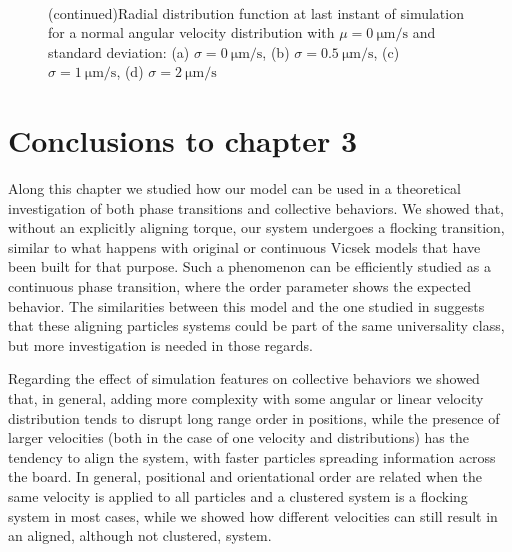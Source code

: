 \documentclass[../../master_thesis_np.tex]{subfiles}
\begin{document}
		\begin{figure}
		\centering
		\ContinuedFloat
			\\
			
			\caption{(continued)Radial distribution function at last instant of simulation for a normal angular velocity distribution with $\mu = \SI{0}{\um\per\second}$ and standard deviation: (a) $\sigma = \SI{0}{\um\per\second}$, (b) $\sigma = \SI{0.5}{\um\per\second}$, (c) $\sigma = \SI{1}{\um\per\second}$, (d) $\sigma = \SI{2}{\um\per\second}$}
			\label{fig:lj_av_rdf}
		\end{figure}
		
    \section{Conclusions to chapter 3}
    \label{3concl}
    Along this chapter we studied how our model can be used in a theoretical investigation of both phase transitions and collective behaviors.
    We showed that, without an explicitly aligning torque, our system undergoes a flocking transition, similar to what happens with original or continuous Vicsek models that have been built for that purpose.
    Such a phenomenon can be efficiently studied as a continuous phase transition, where the order parameter shows the expected behavior.
    The similarities between this model and the one studied in \cite{martin-gomez_collective_2018} suggests that these aligning particles systems could be part of the same universality class, but more investigation is needed in those regards.
    
    Regarding the effect of simulation features on collective behaviors we showed that, in general, adding more complexity with some angular or linear velocity distribution tends to disrupt long range order in positions, while the presence of larger velocities (both in the case of one velocity and distributions) has the tendency to align the system, with faster particles spreading information across the board.
    In general, positional and orientational order are related when the same velocity is applied to all particles and a clustered system is a flocking system in most cases, while we showed how different velocities can still result in an aligned, although not clustered, system.
    
\end{document}
